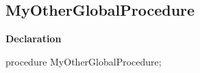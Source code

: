 \documentclass{report}
\newif\ifpdf
\begin{document}
\subsection*{MyOtherGlobalProcedure}
\fi
\label{ok_no_link_inside_class-MyOtherGlobalProcedure}
\begin{list}{}{
\setlength{\itemindent}{0cm}
\setlength{\listparindent}{0cm}
\setlength{\leftmargin}{\evensidemargin}
\addtolength{\leftmargin}{\tmplength}
\settowidth{\labelsep}{X}
\addtolength{\leftmargin}{\labelsep}
\setlength{\labelwidth}{\tmplength}
}
\item[\textbf{Declaration}\hfill]
\ifpdf
\begin{flushleft}
\fi
\begin{ttfamily}
procedure MyOtherGlobalProcedure;\end{ttfamily}

\ifpdf
\end{flushleft}
\fi

\end{list}
\end{document}
